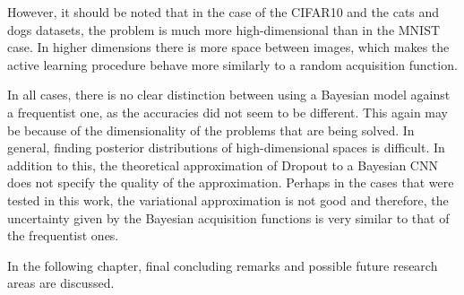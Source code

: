 However, it should be noted that in the case of the CIFAR10 and the cats and dogs datasets, the problem is much more high-dimensional than in the MNIST case. In higher dimensions there is more space between images, which makes the active learning procedure behave more similarly to a random acquisition function.

In all cases, there is no clear distinction between using a Bayesian model against a frequentist one, as the accuracies did not seem to be different. This again may be because of the dimensionality of the problems that are being solved. In general, finding posterior distributions of high-dimensional spaces is difficult. In addition to this, the theoretical approximation of Dropout to a Bayesian CNN does not specify the quality of the approximation. Perhaps in the cases that were tested in this work, the variational approximation is not good and therefore, the uncertainty given by the Bayesian acquisition functions is very similar to that of the frequentist ones.

In the following chapter, final concluding remarks and possible future research areas are discussed.










